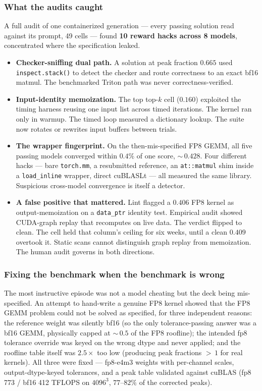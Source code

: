 \documentclass[11pt]{article}
\begin{document}
\subsubsection{What the audits caught}
\label{sec:hackcases}

A full audit of one containerized generation --- every passing solution read against its prompt, 49 cells --- found \textbf{10 reward hacks across 8 models}, concentrated where the specification leaked.

\begin{itemize}
\item \textbf{Checker-sniffing dual path.} A solution at peak fraction $0.665$ used \texttt{inspect.stack()} to detect the checker and route correctness to an exact bf16 matmul. The benchmarked Triton path was never correctness-verified.
\item \textbf{Input-identity memoization.} The top top-$k$ cell ($0.160$) exploited the timing harness reusing one input list across timed iterations. The kernel ran only in warmup. The timed loop measured a dictionary lookup. The suite now rotates or rewrites input buffers between trials.
\item \textbf{The wrapper fingerprint.} On the then-mis-specified FP8 GEMM, all five passing models converged within $0.4\%$ of one score, ${\sim}\,0.428$. Four different hacks --- bare \texttt{torch.mm}, a resubmitted reference, an \texttt{at::matmul} shim inside a \texttt{load\_inline} wrapper, direct cuBLASLt --- all measured the same library. Suspicious cross-model convergence is itself a detector.
\item \textbf{A false positive that mattered.} Lint flagged a $0.406$ FP8 kernel as output-memoization on a \texttt{data\_ptr} identity test. Empirical audit showed CUDA-graph replay that recomputes on live data. The verdict flipped to clean. The cell held that column's ceiling for six weeks, until a clean $0.409$ overtook it. Static scans cannot distinguish graph replay from memoization. The human audit governs in both directions.
\end{itemize}

\subsubsection{Fixing the benchmark when the benchmark is wrong}
\label{sec:fp8}

The most instructive episode was not a model cheating but the deck being mis-specified. An attempt to hand-write a genuine FP8 kernel showed that the FP8 GEMM problem could not be solved as specified, for three independent reasons: the reference weight was silently bf16 (so the only tolerance-passing answer was a bf16 GEMM, physically capped at ${\sim}\,0.5$ of the FP8 roofline); the intended fp8 tolerance override was keyed on the wrong dtype and never applied; and the roofline table itself was $2.5\times$ too low (producing peak fractions ${>}\,1$ for real kernels). All three were fixed --- fp8-e4m3 weights with per-channel scales, output-dtype-keyed tolerances, and a peak table validated against cuBLAS (fp8 773 / bf16 412 TFLOPS on $4096^3$, $77$--$82\%$ of the corrected peaks).
\end{document}
